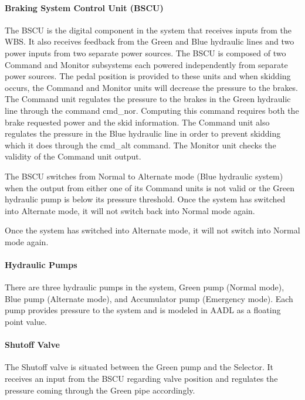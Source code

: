 \paragraph{Braking System Control Unit (BSCU)}
The BSCU is the digital component in the system that receives inputs from the WBS. It also receives feedback from the Green and Blue hydraulic lines and two power inputs from two separate power sources. The BSCU is composed of two Command and Monitor subsystems each powered independently from separate power sources. The pedal position is provided to these units and when skidding occurs, the Command and Monitor units will decrease the pressure to the brakes.
The Command unit regulates the pressure to the brakes in the Green hydraulic line through the command cmd\_nor. Computing this command requires both the brake requested power and the skid information. The Command unit also regulates the pressure in the Blue hydraulic line in order to prevent skidding which it does through the cmd\_alt command. The Monitor unit checks the validity of the Command unit output.

The BSCU switches from Normal to Alternate mode (Blue hydraulic system) when the output from either one of its Command units is not valid or the Green hydraulic pump is below its pressure threshold.  Once the system has switched into Alternate mode, it will not switch back into Normal mode again.

\noindent Once the system has switched into Alternate mode, it will not switch into Normal mode again.

\paragraph{Hydraulic Pumps}
There are three hydraulic pumps in the system, Green pump (Normal mode), Blue pump (Alternate mode), and Accumulator pump (Emergency mode). Each pump provides pressure to the system and is modeled in AADL as a floating point value.

\paragraph{Shutoff Valve}

The Shutoff valve is situated between the Green pump and the Selector. It receives an input from the BSCU regarding valve position and regulates the pressure coming through the Green pipe accordingly.

